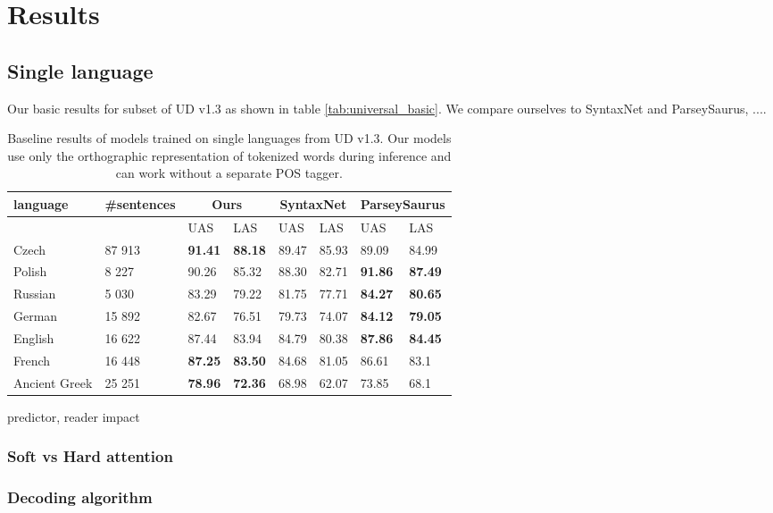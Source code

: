 \chapter{Results}

\section{Single language}
Our basic results for subset of UD v1.3\cite{nivre_universal_2015} as shown
in table \ref{tab:universal_basic}. We compare ourselves to SyntaxNet and
ParseySaurus, ....
\begin{table}[tb]
  \centering
  \caption{Baseline results of models trained on single languages from
    UD v1.3. Our models use only the orthographic representation of
    tokenized words during inference and can work without a separate POS tagger.}
  \label{tab:universal}
  \begin{tabular}{l l | l l | l l | l l}
    language & \#sentences & \multicolumn{2}{c|}{Ours} &
      \multicolumn{2}{c|}{SyntaxNet} & \multicolumn{2}{c}{ParseySaurus} \\ \hline
    & & UAS & LAS & UAS & LAS & UAS & LAS\\ \hline
    Czech & 87 913 & \textbf{91.41} & \textbf{88.18} & 89.47 & 85.93 & 89.09 & 84.99 \\
    Polish & 8 227 & 90.26 & 85.32 & 88.30 & 82.71 & \textbf{91.86} & \textbf{87.49}\\
    Russian & 5 030 & 83.29 & 79.22 & 81.75 & 77.71 & \textbf{84.27} & \textbf{80.65} \\
    German & 15 892 & 82.67 & 76.51 & 79.73 & 74.07 & \textbf{84.12} & \textbf{79.05}\\
    English & 16 622 & 87.44 & 83.94 & 84.79 & 80.38 & \textbf{87.86} & \textbf{84.45}\\ %
    French & 16 448 & \textbf{87.25} & \textbf{83.50} & 84.68 & 81.05 & 86.61 & 83.1\\
    Ancient Greek & 25 251 & \textbf{78.96} & \textbf{72.36} & 68.98 & 62.07 & 73.85 & 68.1
  \end{tabular}
\end{table}
predictor, reader impact

\subsection{Soft vs Hard attention}
\subsection{Decoding algorithm}

